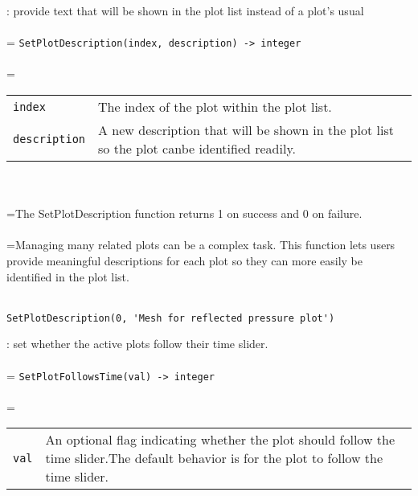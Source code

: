 \documentclass[10pt,a4paper]{report}
\begin{document}
{}
: provide text that will be shown in the plot list instead of a plot's usual\\[-3mm]

 \\ 
\hangindent=\parindent 
\verb!SetPlotDescription(index, description) -> integer!\\ [-3mm]

 \\ 
\hangindent=\parindent 
\begin{tabular}{lp{9cm}}
\verb!index! & The index of the plot within the plot list. \\
\verb!description! & A new description that will be shown in the plot list so the plot canbe identified readily. \\
\end{tabular} \\[-2mm]


 \\ 
\hangindent=\parindent The SetPlotDescription function returns 1 on success and 0 on failure. \\[-3mm] 

 \\ 
\hangindent=\parindent Managing many related plots can be a complex task. This function lets users provide meaningful descriptions for each plot so they can more easily be identified in the plot list. \\[-3mm] 

\\[-6mm]
\begin{verbatim}SetPlotDescription(0, 'Mesh for reflected pressure plot')
\end{verbatim}
\newpage


{}
: set whether the active plots follow their time slider.\\[-3mm]

 \\ 
\hangindent=\parindent 
\verb!SetPlotFollowsTime(val) -> integer!\\ [-3mm]

 \\ 
\hangindent=\parindent 
\begin{tabular}{lp{9cm}}
\verb!val! & An optional flag indicating whether the plot should follow the time slider.The default behavior is for the plot to follow the time slider. \\
\end{tabular} \\[-2mm]
\end{document}
